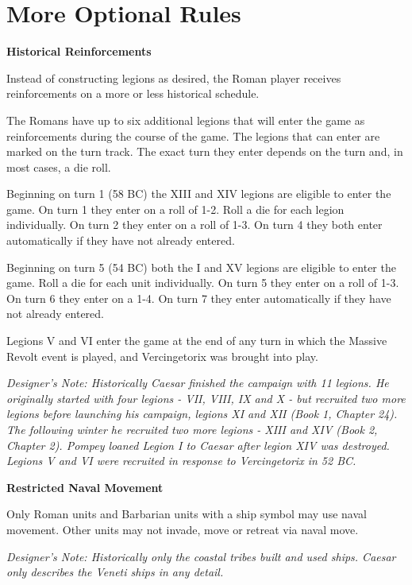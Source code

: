 \pagebreak[4]
\section{More Optional Rules}
\par

\textbf{Historical Reinforcements}

Instead of constructing legions as desired, the Roman player receives reinforcements on a more or less historical schedule.

The Romans have up to six additional legions that will enter the game as reinforcements during the course of the game. The legions that can enter are marked on the turn track. The exact turn they enter depends on the turn and, in most cases, a die roll.

Beginning on turn 1 (58 BC) the XIII and XIV legions are eligible to enter the game. On turn 1 they enter on a roll of 1-2. Roll a die for each legion individually. On turn 2 they enter on a roll of 1-3. On turn 4 they both enter automatically if they have not already entered.

Beginning on turn 5 (54 BC) both the I and XV legions are eligible to enter the game. Roll a die for each unit individually. On turn 5 they enter on a roll of 1-3. On turn 6 they enter on a 1-4. On turn 7 they enter automatically if they have not already entered.

Legions V and VI enter the game at the end of any turn in which the Massive Revolt event is played, and Vercingetorix was brought into play.

\textit{Designer's Note: Historically Caesar finished the campaign with 11 legions. He originally started with four legions - VII, VIII, IX and X - but recruited two more legions before launching his campaign, legions XI and XII (Book 1, Chapter 24). The following winter he recruited two more legions - XIII and XIV (Book 2, Chapter 2). Pompey loaned Legion I to Caesar after legion XIV was destroyed. Legions V and VI were recruited in response to Vercingetorix in 52 BC.}

\textbf{Restricted Naval Movement}

Only Roman units and Barbarian units with a ship symbol may use naval movement. Other units may not invade, move or retreat via naval move.

\textit{Designer's Note: Historically only the coastal tribes built and used ships. Caesar only describes the Veneti ships in any detail.}